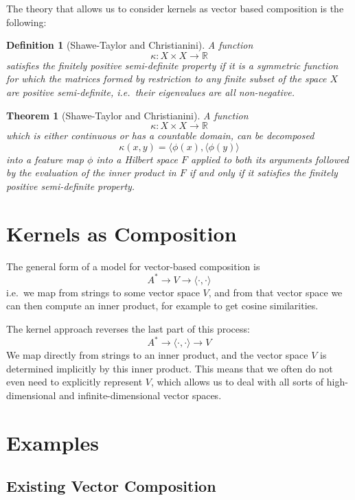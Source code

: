 \documentclass{article}
\newtheorem{definition}{Definition}
\newtheorem{theorem}{Theorem}
\begin{document}
The theory that allows us to consider kernels as vector based
composition is the following:

\begin{definition}[Shawe-Taylor and Christianini]
A function
$$\kappa : X \times X \longrightarrow \mathbb{R}$$
satisfies the finitely positive semi-definite property if it is a
symmetric function for which the matrices formed by restriction to any
finite subset of the space $X$ are positive semi-definite, i.e.~their
eigenvalues are all non-negative.
\end{definition}

\begin{theorem}[Shawe-Taylor and Christianini]
A function
$$\kappa : X \times X \longrightarrow \mathbb{R}$$
which is either continuous or has a countable domain, can be
decomposed
$$\kappa(x, y) = \langle\phi(x), \langle\phi(y)\rangle$$
into a feature map $\phi$ into a Hilbert space $F$ applied to both its
arguments followed by the evaluation of the inner product in $F$ if
and only if it satisfies the finitely positive semi-definite
property.
\end{theorem}

\section{Kernels as Composition}

The general form of a model for vector-based composition is
$$A^* \longrightarrow V \longrightarrow \langle \cdot,\cdot\rangle$$
i.e.~we map from strings to some vector space $V$, and from that
vector space we can then compute an inner product, for example to get
cosine similarities.

The kernel approach reverses the last part of this process:
$$A^* \longrightarrow \langle \cdot,\cdot\rangle \longrightarrow V$$
We map directly from strings to an inner product, and the vector space
$V$ is determined implicitly by this inner product. This means that we
often do not even need to explicitly represent $V$, which allows us to
deal with all sorts of high-dimensional and infinite-dimensional
vector spaces.

\section{Examples}

\subsection*{Existing Vector Composition}
\end{document}
